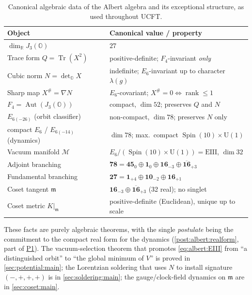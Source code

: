 \documentclass[11pt]{article}
\renewcommand{\arraystretch}{1.18}
\theoremstyle{plain}
\theoremstyle{definition}
\theoremstyle{remark}
\begin{document}
\begin{table}[ht]
\centering
\renewcommand{\arraystretch}{1.3}
\begin{tabular}{ll}
\hline
Object & Canonical value / property \\
\hline
$\dim_{\mathbb{R}} J_{3}(\mathbb{O})$ & $27$ \\
Trace form $Q=\operatorname{Tr}(X^{2})$ & positive-definite; $F_{4}$-invariant \emph{only} \\
Cubic norm $N=\det_{\mathbb{O}}X$ & indefinite; $E_{6}$-invariant up to character $\lambda(g)$ \\
Sharp map $X^{\#}=\nabla N$ & $E_{6}$-covariant; $X^{\#}=0\Leftrightarrow\operatorname{rank}\le1$ \\
$F_{4}=\operatorname{Aut}(J_{3}(\mathbb{O}))$ & compact, $\dim 52$; preserves $Q$ and $N$ \\
$E_{6(-26)}$ (orbit classifier) & non-compact, $\dim 78$; preserves $N$ only \\
compact $E_{6}$ / $E_{6(-14)}$ (dynamics) & $\dim 78$; max.\ compact $\operatorname{Spin}(10)\times\mathrm{U}(1)$ \\
Vacuum manifold $\mathcal{M}$ & $E_{6}/(\operatorname{Spin}(10)\times\mathrm{U}(1))=\mathrm{EIII}$, $\dim 32$ \\
Adjoint branching & $\mathbf{78}=\mathbf{45}_{0}\oplus\mathbf{1}_{0}\oplus\mathbf{16}_{-3}\oplus\overline{\mathbf{16}}_{+3}$ \\
Fundamental branching & $\mathbf{27}=\mathbf{1}_{+4}\oplus\mathbf{10}_{-2}\oplus\mathbf{16}_{+1}$ \\
Coset tangent $\mathfrak{m}$ & $\mathbf{16}_{-3}\oplus\overline{\mathbf{16}}_{+3}$ (32 real); no singlet \\
Coset metric $K|_{\mathfrak{m}}$ & positive-definite (Euclidean), unique up to scale \\
\hline
\end{tabular}
\caption{Canonical algebraic data of the Albert algebra and its
exceptional structure, as used throughout UCFT.}
\label{tab:albert:summary}
\end{table}

These facts are purely algebraic theorems, with the single
\emph{postulate} being the commitment to the compact real form for the
dynamics (\autoref{post:albert:realform}, part of
\hyperref[post:potential:P1]{P1}). The vacuum-selection theorem that
promotes \eqref{eq:albert:EIII} from ``a distinguished orbit'' to ``the
global minimum of $V$'' is proved in \autoref{sec:potential:main}; the
Lorentzian soldering that uses $N$ to install signature $(-,+,+,+)$ is in
\autoref{sec:soldering:main}; the gauge/clock-field dynamics on
$\mathfrak{m}$ are in \autoref{sec:coset:main}.
\end{document}
